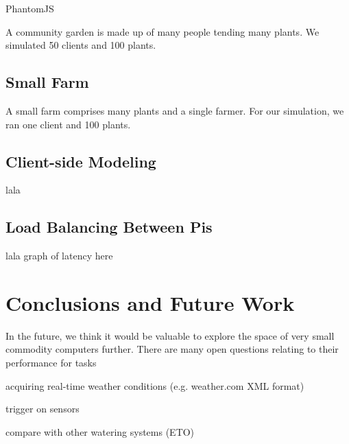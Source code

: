 \documentclass[a4paper]{acm_proc_article-sp}
\begin{document}
PhantomJS

A community garden is made up of many people tending many plants.  We simulated 50 clients and 100 plants.

\subsection{Small Farm}

A small farm comprises many plants and a single farmer.  For our simulation, we ran one client and 100 plants.

\subsection{Client-side Modeling}

lala

\subsection{Load Balancing Between Pis}

lala
graph of latency here

\section{Conclusions and Future Work}

In the future, we think it would be valuable to explore the space of very small commodity computers further.  There are many open questions relating to their performance for tasks

acquiring real-time weather conditions (e.g. weather.com XML format)

trigger on sensors

compare with other watering systems (ETO)



\end{document}
